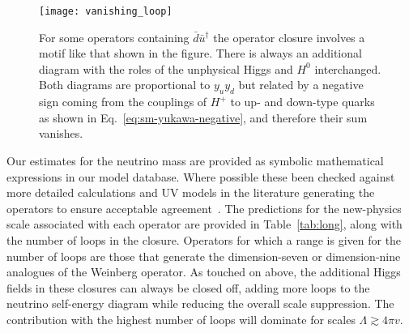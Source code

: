 \begin{figure}[t]
  \centering
  \texttt{[image: vanishing\_loop]}
  \caption[For some operators containing $\bar{d} \bar{u}^{\dagger}$ the
  operator closure involves a motif like that shown in the figure.]{For some
    operators containing $\bar{d} \bar{u}^{\dagger}$ the operator closure
    involves a motif like that shown in the figure. There is always an
    additional diagram with the roles of the unphysical Higgs and $H^{0}$
    interchanged. Both diagrams are proportional to $y_{u} y_{d}$ but related by
    a negative sign coming from the couplings of $H^{+}$ to up- and down-type
    quarks as shown in Eq.~\eqref{eq:sm-yukawa-negative}, and therefore their
    sum vanishes.}
  \label{fig:vanishing-loop}
\end{figure}

Our estimates for the neutrino mass are provided as symbolic mathematical
expressions in our model database. Where possible these been checked against
more detailed calculations and UV models in the literature generating the
operators to ensure acceptable agreement~\cite{Duerr:2011zd, Babu:2009aq,
  Babu:2010vp, delAguila:2012nu, Cai:2014kra, Zee:1985id, Babu:1988ki,
  Angel:2013hla, Gargalionis:2019drk}. The predictions for the new-physics scale
associated with each operator are provided in Table~\ref{tab:long}, along with
the number of loops in the closure. Operators for which a range is given for the
number of loops are those that generate the dimension-seven or dimension-nine
analogues of the Weinberg operator. As touched on above, the additional Higgs
fields in these closures can always be closed off, adding more loops to the
neutrino self-energy diagram while reducing the overall scale suppression. The
contribution with the highest number of loops will dominate for scales
$\Lambda \gtrsim 4\pi v$.

